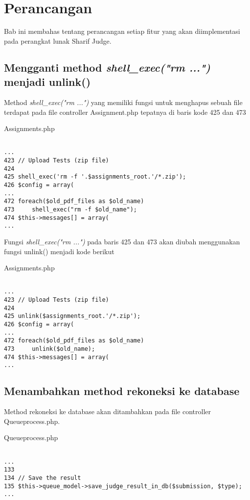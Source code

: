 \chapter{Perancangan}
\label{chap:perancangan}

Bab ini membahas tentang perancangan setiap fitur yang akan diimplementasi pada perangkat lunak Sharif Judge. 

\section{Mengganti method \textit{shell\_exec("rm ...")} menjadi unlink()}
Method \textit{shell\_exec("rm ...")} yang memiliki fungsi untuk menghapus sebuah file terdapat pada file controller Assignment.php tepatnya di baris kode 425 dan 473

Assignments.php
\begin{lstlisting}[basicstyle=\ttfamily, frame=single,
columns=fullflexible, keepspaces=true]

...
423	// Upload Tests (zip file)
424	
425	shell_exec('rm -f '.$assignments_root.'/*.zip');
426	$config = array(
...
472	foreach($old_pdf_files as $old_name)
473		shell_exec("rm -f $old_name");
474	$this->messages[] = array(
...

\end{lstlisting}

Fungsi \textit{shell\_exec("rm ...")} pada baris 425 dan 473 akan diubah menggunakan fungsi unlink() menjadi kode berikut

Assignments.php
\begin{lstlisting}[basicstyle=\ttfamily, frame=single,
columns=fullflexible, keepspaces=true]

...
423	// Upload Tests (zip file)
424	
425	unlink($assignments_root.'/*.zip');
426	$config = array(
...
472	foreach($old_pdf_files as $old_name)
473		unlink($old_name);
474	$this->messages[] = array(
...

\end{lstlisting}

\section{Menambahkan method rekoneksi ke database}
Method rekoneksi ke database akan ditambahkan pada file controller Queueprocess.php. 

Queueprocess.php
\begin{lstlisting}[basicstyle=\ttfamily, frame=single,
columns=fullflexible, keepspaces=true]

...
133
134	// Save the result
135	$this->queue_model->save_judge_result_in_db($submission, $type);
...

\end{lstlisting}


